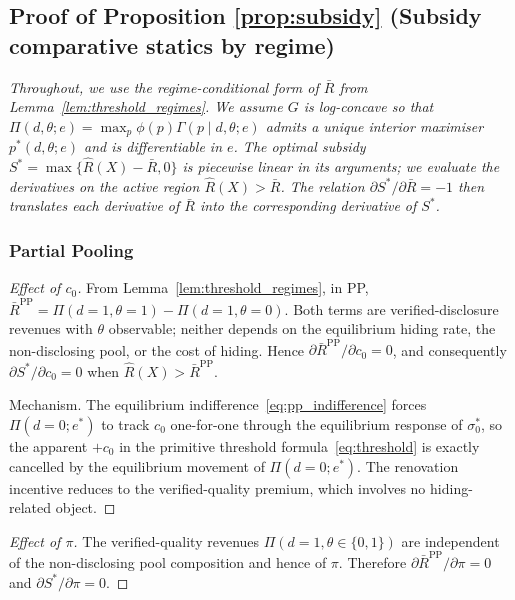 \documentclass[10pt,letterpaper]{bp-template-concise}
\begin{document}
\subsection*{Proof of Proposition \ref{prop:subsidy} (Subsidy comparative statics by regime)}

\noindent\textit{Throughout, we use the regime-conditional form of $\bar R$ from Lemma~\ref{lem:threshold_regimes}. We assume $G$ is log-concave so that $\Pi(d,\theta;e) = \max_p \phi(p)\Gamma(p\mid d,\theta;e)$ admits a unique interior maximiser $p^*(d,\theta;e)$ and is differentiable in $e$. The optimal subsidy $S^* = \max\{\hat R(X) - \bar R, 0\}$ is piecewise linear in its arguments; we evaluate the derivatives on the active region $\hat R(X) > \bar R$. The relation $\partial S^*/\partial \bar R = -1$ then translates each derivative of $\bar R$ into the corresponding derivative of $S^*$.}

\subsubsection*{Partial Pooling}

\begin{proof}[Effect of $c_0$]
From Lemma~\ref{lem:threshold_regimes}, in PP, $\bar R^{\text{PP}} = \Pi(d=1,\theta=1) - \Pi(d=1,\theta=0)$. Both terms are verified-disclosure revenues with $\theta$ observable; neither depends on the equilibrium hiding rate, the non-disclosing pool, or the cost of hiding. Hence $\partial \bar R^{\text{PP}}/\partial c_0 = 0$, and consequently $\partial S^*/\partial c_0 = 0$ when $\hat R(X) > \bar R^{\text{PP}}$.

Mechanism. The equilibrium indifference~\eqref{eq:pp_indifference} forces $\Pi(d=0;e^*)$ to track $c_0$ one-for-one through the equilibrium response of $\sigma_0^*$, so the apparent $+c_0$ in the primitive threshold formula~\eqref{eq:threshold} is exactly cancelled by the equilibrium movement of $\Pi(d=0;e^*)$. The renovation incentive reduces to the verified-quality premium, which involves no hiding-related object.
\end{proof}

\begin{proof}[Effect of $\pi$]
The verified-quality revenues $\Pi(d=1,\theta\in\{0,1\})$ are independent of the non-disclosing pool composition and hence of $\pi$. Therefore $\partial \bar R^{\text{PP}}/\partial \pi = 0$ and $\partial S^*/\partial \pi = 0$.
\end{proof}
\end{document}
